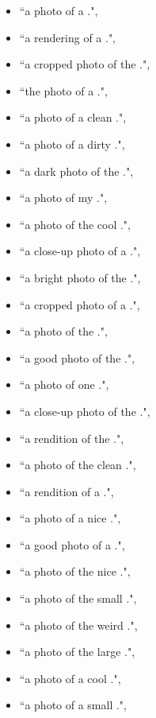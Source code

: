 \begin{itemize}
    \item ``a photo of a \pholder.",
    \item ``a rendering of a \pholder.",
    \item ``a cropped photo of the \pholder.",
    \item ``the photo of a \pholder.",
    \item ``a photo of a clean \pholder.",
    \item ``a photo of a dirty \pholder.",
    \item ``a dark photo of the \pholder.",
    \item ``a photo of my \pholder.",
    \item ``a photo of the cool \pholder.",
    \item ``a close-up photo of a \pholder.",
    \item ``a bright photo of the \pholder.",
    \item ``a cropped photo of a \pholder.",
    \item ``a photo of the \pholder.",
    \item ``a good photo of the \pholder.",
    \item ``a photo of one \pholder.",
    \item ``a close-up photo of the \pholder.",
    \item ``a rendition of the \pholder.",
    \item ``a photo of the clean \pholder.",
    \item ``a rendition of a \pholder.",
    \item ``a photo of a nice \pholder.",
    \item ``a good photo of a \pholder.",
    \item ``a photo of the nice \pholder.",
    \item ``a photo of the small \pholder.",
    \item ``a photo of the weird \pholder.",
    \item ``a photo of the large \pholder.",
    \item ``a photo of a cool \pholder.",
    \item ``a photo of a small \pholder.",
\end{itemize}